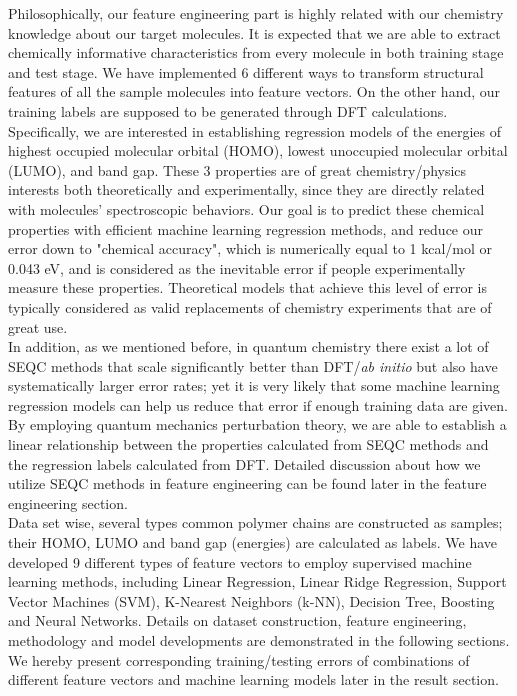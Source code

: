 Philosophically, our feature engineering part is highly related with our chemistry knowledge about our target molecules. It is expected that we are able to extract chemically informative characteristics from every molecule in both training stage and test stage. We have implemented 6 different ways to transform structural features of all the sample molecules into feature vectors. On the other hand, our training labels are supposed to be generated through DFT calculations. Specifically, we are interested in establishing regression models of the energies of highest occupied molecular orbital (HOMO), lowest unoccupied molecular orbital (LUMO), and band gap. These 3 properties are of great chemistry/physics interests both theoretically and experimentally, since they are directly related with molecules' spectroscopic behaviors. Our goal is to predict these chemical properties with efficient machine learning regression methods, and reduce our error down to "chemical accuracy", which is numerically equal to 1 kcal/mol or 0.043 eV, and is considered as the inevitable error if people experimentally measure these properties. Theoretical models that achieve this level of error is typically considered as valid replacements of chemistry experiments that are of great use. \\

In addition, as we mentioned before, in quantum chemistry there exist a lot of SEQC methods that scale significantly better than DFT/\textit{ab initio} but also have systematically larger error rates; yet it is very likely that some machine learning regression models can help us reduce that error if enough training data are given. By employing quantum mechanics perturbation theory, we are able to establish a linear relationship between the properties calculated from SEQC methods and the regression labels calculated from DFT. Detailed discussion about how we utilize SEQC methods in feature engineering can be found later in the feature engineering section. \\

Data set wise, several types common polymer chains are constructed as samples; their HOMO, LUMO and band gap (energies) are calculated as labels. We have developed 9 different types of feature vectors to employ supervised machine learning methods, including Linear Regression, Linear Ridge Regression, Support Vector Machines (SVM), K-Nearest Neighbors (k-NN), Decision Tree, Boosting and Neural Networks. Details on dataset construction, feature engineering, methodology and model developments are demonstrated in the following sections. We hereby present corresponding training/testing errors of combinations of different feature vectors and machine learning models later in the result section. \\
